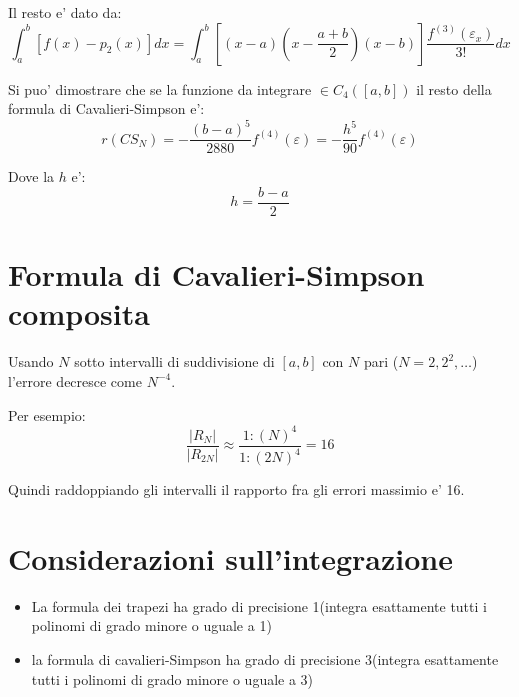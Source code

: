 Il resto e' dato da:
\begin{equation}
  \int_a^b [f(x) - p_2(x)]dx = \int_a^b [(x-a)(x-\frac{a+b}{2})(x-b)]\frac{f^{(3)}(\varepsilon_x)}{3!}dx
\end{equation}

Si puo' dimostrare che se la funzione da integrare $\in C_4([a, b])$ il resto della formula di Cavalieri-Simpson e':
\begin{equation}
  r(CS_N) = - \frac{(b-a)^5}{2880}f^{(4)}(\varepsilon) = - \frac{h^5}{90}f^{(4)}(\varepsilon)
\end{equation}

Dove la $h$ e':
\begin{equation}
   h = \frac{b-a}{2}
\end{equation}

\section{Formula di Cavalieri-Simpson composita}
Usando $N$ sotto intervalli di suddivisione di $[a, b]$ con $N$ pari ($N = 2, 2^2, \dots$)
l'errore decresce come $N^{-4}$.

Per esempio:
\begin{equation}
  \frac{|R_N|}{|R_{2N}|} \approx \frac{1: (N)^{4}}{1: (2N)^{4}} = 16
\end{equation}

Quindi raddoppiando gli intervalli il rapporto fra gli errori massimio e' 16.


\section{Considerazioni sull'integrazione}
\begin{itemize}
  \item La formula dei trapezi ha grado di precisione 1(integra esattamente tutti i polinomi di grado minore o uguale a 1)
  \item la formula di cavalieri-Simpson ha grado di precisione 3(integra esattamente tutti i polinomi di grado minore o uguale a 3)
\end{itemize}
